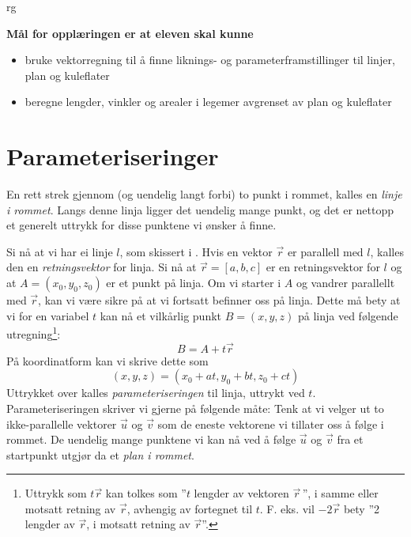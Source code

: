 



{rg}
\eqlen

\textbf{Mål for opplæringen er at eleven skal kunne}
\begin{itemize}
	\item bruke vektorregning til å finne liknings- og parameterframstillinger til linjer, plan og kuleflater
	\item beregne lengder, vinkler og arealer i legemer avgrenset av plan og kuleflater
\end{itemize}

\newpage
\section{Parameteriseringer}
En rett strek gjennom (og uendelig langt forbi) to punkt i rommet, kalles en \textit{linje i rommet}. Langs denne linja ligger det uendelig mange punkt, og det er nettopp et generelt uttrykk for disse punktene vi ønsker å finne.\vsk

Si nå at vi har ei linje $ l $, som skissert i .
Hvis en vektor $ \vec{r} $ er parallell med $ l $, kalles den en \textit{retningsvektor}  for linja. Si nå at $ {\vec{r}=[a, b, c]} $ er en retningsvektor for $ l $ og at $ A=(x_0, y_0, z_0) $ er et punkt på linja. Om vi starter i $ A $ og vandrer parallellt med $ \vec{r} $, kan vi være sikre på at vi fortsatt befinner oss på linja. Dette må bety at vi for en variabel $ t $ kan nå et vilkårlig punkt $ B=(x, y, z) $ på linja ved følgende utregning\footnote{Uttrykk som $ t\vec{r} $ kan tolkes som ''$ t $ lengder av vektoren $ \vec{r} $\,'', i samme eller motsatt retning av $ \vec{r} $, avhengig av fortegnet til $ t $. F. eks. vil $ -2\vec{r} $ bety ''2 lengder av $ \vec{r} $, i motsatt retning av $ \vec{r} $''.}:
\[B= A+t\vec{r} \]
På koordinatform kan vi skrive dette som
\[(x, y, z)= (x_0 +at, y_0+bt, z_0 + ct) \]
Uttrykket over kalles \textit{parameteriseringen} til linja, uttrykt ved $ t $. Parameteriseringen skriver vi gjerne på følgende måte:
\newpage
\liro
\liroe
{}
Tenk at vi velger ut to ikke-parallelle vektorer $ \vec{u} $ og $ \vec{v} $ som de eneste vektorene vi tillater oss å følge i rommet. De uendelig mange punktene vi kan nå ved å følge $ \vec{u} $ og $ \vec v $ fra et startpunkt utgjør da et \textit{plan i rommet}. \vsk

